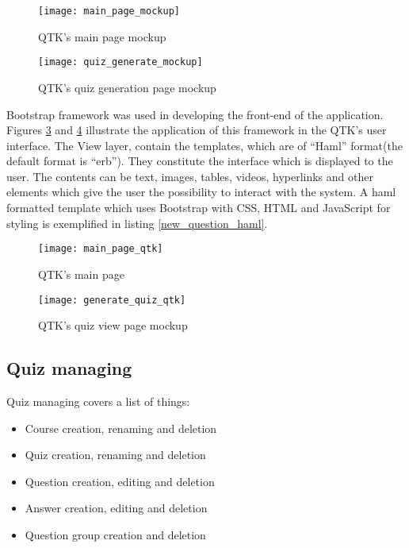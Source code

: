 \begin{figure}[!ht]
\centering
\texttt{[image: main\_page\_mockup]}
\caption{QTK's main page mockup}\label{main_page_mockup}
\end{figure}

\begin{figure}[!ht]
\centering
\texttt{[image: quiz\_generate\_mockup]}
\caption{QTK's quiz generation page mockup}\label{quiz_generate_mockup}
\end{figure}


Bootstrap\cite{bootstrap} framework was used in developing the front-end of the application. Figures \ref{main_page_qtk} and \ref{generate_quiz_qtk} illustrate the application of this framework in the QTK's user interface.
The View layer, contain the templates, which are of ``Haml'' format(the default format is ``erb''). They constitute the interface which is displayed to the user. The contents can be text, images, tables, videos, hyperlinks and other elements which give the user the possibility to interact with the system. A haml formatted template which uses Bootstrap with CSS, HTML and JavaScript for styling is exemplified in listing \ref{new_question_haml}.

\begin{figure}[!ht]
\centering
\texttt{[image: main\_page\_qtk]}
\caption{QTK's main page}\label{main_page_qtk}
\end{figure}

\begin{figure}[!ht]
\centering
\texttt{[image: generate\_quiz\_qtk]}
\caption{QTK's quiz view page mockup}\label{generate_quiz_qtk}
\end{figure}



\subsection{Quiz managing}
Quiz managing covers a list of things:
\begin{itemize}
  \item Course creation, renaming and deletion
  \item Quiz creation, renaming and deletion
  \item Question creation, editing and deletion
  \item Answer creation, editing and deletion
  \item Question group creation and deletion
\end{itemize}

